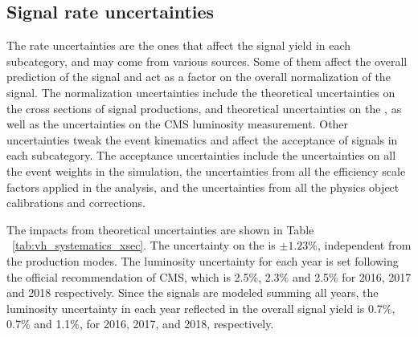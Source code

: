\subsection{Signal rate uncertainties}\label{sec:rate_uncertainty}

The rate uncertainties are the ones that affect the signal yield in each subcategory, and may come from various sources.
Some of them affect the overall prediction of the signal and act as a factor on the overall normalization of the signal.
The normalization uncertainties include the theoretical uncertainties on the cross sections of signal productions, 
and theoretical uncertainties on the \brhmm, as well as the uncertainties on the CMS luminosity measurement.
Other uncertainties tweak the event kinematics and affect the acceptance of signals in each subcategory.
The acceptance uncertainties include the uncertainties on all the event weights in the simulation, 
the uncertainties from all the efficiency scale factors applied in the analysis, 
and the uncertainties from all the physics object calibrations and corrections.

The impacts from theoretical uncertainties are shown in Table ~\ref{tab:vh_systematics_xsec}. 
The uncertainty on the \brhmm is $\pm 1.23\%$, independent from the production modes.
The luminosity uncertainty for each year is set following the official recommendation of CMS, 
which is 2.5\%, 2.3\% and 2.5\% for 2016, 2017 and 2018 respectively. 
Since the signals are modeled summing all years, 
the luminosity uncertainty in each year reflected in the overall signal yield is 0.7\%, 0.7\% and 1.1\%, for 2016, 2017, and 2018, respectively. 


